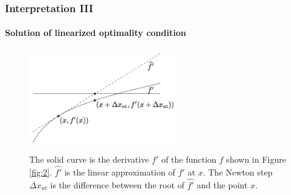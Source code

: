 \documentclass{beamer}
\begin{document}
\begin{frame}
\frametitle{Interpretation III}
\framesubtitle{Solution of linearized optimality condition}
\begin{figure}
\includegraphics[width=2.5in]{figure/linear.png}
\label{fig:3}
\caption{
The solid curve is the derivative $f'$ of the function $f$ shown in Figure
\ref{fig:2}.
$\hat{f'}$ is the linear approximation of $f'$ at $x$. The Newton step
$\Delta x_{nt}$ is the difference between the root of $\hat{f'}$ and the point $x$.
}
\end{figure}
\end{frame}
\end{document}
